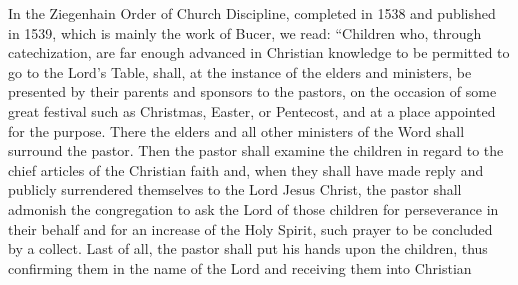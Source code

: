 In the Ziegenhain Order of Church Discipline, completed in 1538 and published in 1539, which is mainly the work of Bucer, we read: “Children who, through catechization, are far enough advanced in Christian knowledge to be permitted to go to the Lord’s Table, shall, at the instance of the elders and ministers, be presented by their parents and sponsors to the pastors, on the occasion of some great festival such as Christmas, Easter, or Pentecost, and at a place appointed for the purpose. There the elders and all other ministers of the Word shall surround the pastor. Then the pastor shall examine the children in regard to the chief articles of the Christian faith and, when they shall have made reply and publicly surrendered themselves to the Lord Jesus Christ, the pastor shall admonish the congregation to ask the Lord of those children for perseverance in their behalf and for an increase of the Holy Spirit, such prayer to be concluded by a collect. Last of all, the pastor shall put his hands upon the children, thus confirming them in the name of the Lord and receiving them into Christian

